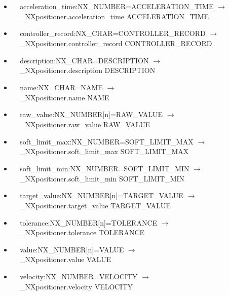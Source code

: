 \documentclass[11pt]{article}
\begin{document}
{{\begin{itemize}
\item{\verb|  |acceleration\_time:NX\_NUMBER=ACCELERATION\_TIME $\rightarrow$\\
\verb|  |\_NXpositioner.acceleration\_time ACCELERATION\_TIME}

\item{\verb|  |controller\_record:NX\_CHAR=CONTROLLER\_RECORD $\rightarrow$\\
\verb|  |\_NXpositioner.controller\_record CONTROLLER\_RECORD}

\item{\verb|  |description:NX\_CHAR=DESCRIPTION $\rightarrow$\\
\verb|  |\_NXpositioner.description DESCRIPTION}

\item{\verb|  |name:NX\_CHAR=NAME $\rightarrow$\\
\verb|  |\_NXpositioner.name NAME}

\item{\verb|  |raw\_value:NX\_NUMBER[n]=RAW\_VALUE $\rightarrow$\\
\verb|  |\_NXpositioner.raw\_value RAW\_VALUE}

\item{\verb|  |soft\_limit\_max:NX\_NUMBER=SOFT\_LIMIT\_MAX $\rightarrow$\\
\verb|  |\_NXpositioner.soft\_limit\_max SOFT\_LIMIT\_MAX}

\item{\verb|  |soft\_limit\_min:NX\_NUMBER=SOFT\_LIMIT\_MIN $\rightarrow$\\
\verb|  |\_NXpositioner.soft\_limit\_min SOFT\_LIMIT\_MIN}

\item{\verb|  |target\_value:NX\_NUMBER[n]=TARGET\_VALUE $\rightarrow$\\
\verb|  |\_NXpositioner.target\_value TARGET\_VALUE}

\item{\verb|  |tolerance:NX\_NUMBER[n]=TOLERANCE $\rightarrow$\\
\verb|  |\_NXpositioner.tolerance TOLERANCE}

\item{\verb|  |value:NX\_NUMBER[n]=VALUE $\rightarrow$\\
\verb|  |\_NXpositioner.value VALUE}

\item{\verb|  |velocity:NX\_NUMBER=VELOCITY $\rightarrow$\\
\verb|  |\_NXpositioner.velocity VELOCITY}
\end{itemize}
}}
\end{document}
